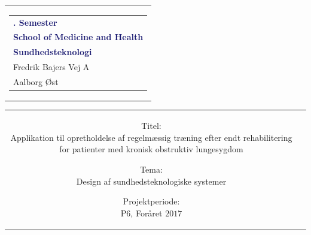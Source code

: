% 
\thispagestyle{empty}
\begin{nopagebreak}
	{\samepage 
		
		\begin{tabular}{r}
			\parbox{\textwidth}{  
				\hfill \hspace{2cm} \parbox{8cm}{\begin{tabular}{l} %
						{\small \textbf{\textcolor{MidnightBlue}{{$6$. Semester}}}}\\
						{\small \textbf{\textcolor{MidnightBlue}{School of Medicine and Health}}}\\
						{\small \textbf{\textcolor{MidnightBlue}{Sundhedsteknologi}}}\\
						{\small \textcolor{NavyBlue}{Fredrik Bajers Vej $7$A}} \\
						{\small \textcolor{NavyBlue}{$9220$ Aalborg Øst}} \\
			\end{tabular}}}
		\end{tabular}

		\begin{tabular}{cc}
			\parbox{7cm}{
				\begin{description}

\item {Titel:} \\
Applikation til opretholdelse af regelmæssig træning efter endt rehabilitering for patienter med kronisk obstruktiv lungesygdom\\

\item {Tema:} \\
Design af sundhedsteknologiske systemer \\

\end{description}

\parbox{8cm}{

\begin{description}
\item {Projektperiode:}\\
   P$6$, Foråret $2017$\\
   

\end{description}}}
\end{tabular}}
\end{nopagebreak}
